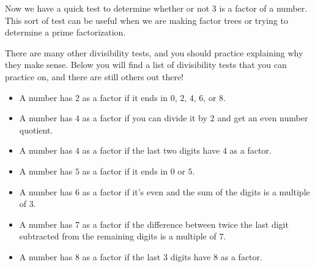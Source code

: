 \documentclass{ximera}
\begin{document}
Now we have a quick test to determine whether or not $3$ is a factor of a number. This sort of test can be useful when we are making factor trees or trying to determine a prime factorization.



There are many other divisibility tests, and you should practice explaining why they make sense. Below you will find a list of  divisibility tests that you can practice on, and there are still others out there!
\begin{itemize}
\item A number has $2$ as a factor if it ends in $0$, $2$, $4$, $6$, or $8$.
\item A number has $4$ as a factor if you can divide it by $2$ and get an even number quotient.
\item A number has $4$ as a factor if the last two digits have $4$ as a factor.
\item A number has $5$ as a factor if it ends in $0$ or $5$.
\item A number has $6$ as a factor if it's even and the sum of the digits is a multiple of $3$.
\item A number has $7$ as a factor if the difference between twice the last digit subtracted from the remaining digits is a multiple of $7$.
\item A number has $8$ as a factor if the last $3$ digits have 8 as a factor.
\end{itemize}
\end{document}

